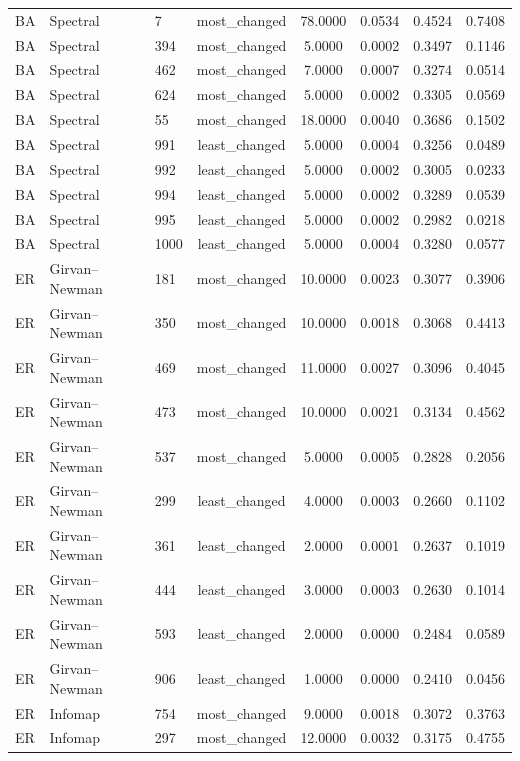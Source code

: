 \begin{longtable}{lllccccc}
BA & Spectral & 7 & most\_changed & 78.0000 & 0.0534 & 0.4524 & 0.7408 \\
BA & Spectral & 394 & most\_changed & 5.0000 & 0.0002 & 0.3497 & 0.1146 \\
BA & Spectral & 462 & most\_changed & 7.0000 & 0.0007 & 0.3274 & 0.0514 \\
BA & Spectral & 624 & most\_changed & 5.0000 & 0.0002 & 0.3305 & 0.0569 \\
BA & Spectral & 55 & most\_changed & 18.0000 & 0.0040 & 0.3686 & 0.1502 \\
BA & Spectral & 991 & least\_changed & 5.0000 & 0.0004 & 0.3256 & 0.0489 \\
BA & Spectral & 992 & least\_changed & 5.0000 & 0.0002 & 0.3005 & 0.0233 \\
BA & Spectral & 994 & least\_changed & 5.0000 & 0.0002 & 0.3289 & 0.0539 \\
BA & Spectral & 995 & least\_changed & 5.0000 & 0.0002 & 0.2982 & 0.0218 \\
BA & Spectral & 1000 & least\_changed & 5.0000 & 0.0004 & 0.3280 & 0.0577 \\
ER & Girvan--Newman & 181 & most\_changed & 10.0000 & 0.0023 & 0.3077 & 0.3906 \\
ER & Girvan--Newman & 350 & most\_changed & 10.0000 & 0.0018 & 0.3068 & 0.4413 \\
ER & Girvan--Newman & 469 & most\_changed & 11.0000 & 0.0027 & 0.3096 & 0.4045 \\
ER & Girvan--Newman & 473 & most\_changed & 10.0000 & 0.0021 & 0.3134 & 0.4562 \\
ER & Girvan--Newman & 537 & most\_changed & 5.0000 & 0.0005 & 0.2828 & 0.2056 \\
ER & Girvan--Newman & 299 & least\_changed & 4.0000 & 0.0003 & 0.2660 & 0.1102 \\
ER & Girvan--Newman & 361 & least\_changed & 2.0000 & 0.0001 & 0.2637 & 0.1019 \\
ER & Girvan--Newman & 444 & least\_changed & 3.0000 & 0.0003 & 0.2630 & 0.1014 \\
ER & Girvan--Newman & 593 & least\_changed & 2.0000 & 0.0000 & 0.2484 & 0.0589 \\
ER & Girvan--Newman & 906 & least\_changed & 1.0000 & 0.0000 & 0.2410 & 0.0456 \\
ER & Infomap & 754 & most\_changed & 9.0000 & 0.0018 & 0.3072 & 0.3763 \\
ER & Infomap & 297 & most\_changed & 12.0000 & 0.0032 & 0.3175 & 0.4755 \\

\end{longtable}
